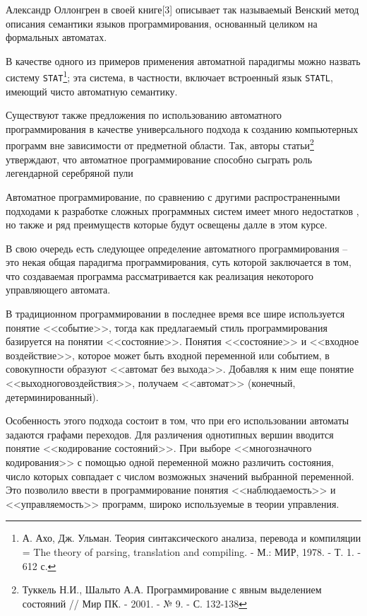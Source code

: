 \documentclass[12pt, twoside]{report}
\begin{document}
Александр Оллонгрен в своей книге[3] описывает так называемый Венский метод описания семантики языков программирования, основанный целиком на формальных автоматах.

В качестве одного из примеров применения автоматной парадигмы можно назвать систему \texttt{STAT}\footnote{А. Ахо, Дж. Ульман. Теория синтаксического анализа, перевода и компиляции = The theory of parsing, translation and compiling. - М.: МИР, 1978. - Т. 1. - 612 с.}; эта система, в частности, включает встроенный язык \texttt{STATL}, имеющий чисто автоматную семантику.

Существуют также предложения по использованию автоматного программирования в качестве универсального подхода к созданию компьютерных программ вне зависимости от предметной области. Так, авторы статьи\footnote{Туккель Н.И., Шалыто А.А. Программирование с явным выделением состояний // Мир ПК. - 2001. - № 9. - С. 132-138} утверждают, что автоматное программирование способно сыграть роль легендарной серебряной пули

Автоматное программирование, по сравнению с другими распространенными подходами к
разработке сложных программных систем имеет много недостатков ,
но также и ряд преимуществ которые будут освещены далле в этом курсе.

В свою очередь есть следующее определение автоматного программирования \cite{Karpov:AutomataLanguage} -- это некая общая парадигма программирования, суть которой заключается в том, что создаваемая программа рассматривается как реализация некоторого управляющего автомата.

В традиционном программировании в последнее время все шире используется понятие <<событие>>,
тогда как предлагаемый стиль программирования базируется на понятии <<состояние>>. Понятия
<<состояние>> и <<входное воздействие>>, которое может быть входной переменной или событием,
в совокупности образуют <<автомат без выхода>>. Добавляя к ним еще понятие <<выходноговоздействия>>,
получаем <<автомат>> (конечный, детерминированный)\cite{Shalito:AutomataProgramming2}.

Особенность этого подхода состоит в том, что при его использовании автоматы задаются графами переходов.
Для различения однотипных вершин вводится понятие <<кодирование состояний>>. При выборе <<многозначного кодирования>>
с помощью одной переменной можно различить состояния, число которых совпадает с числом возможных значений
выбранной переменной. Это позволило ввести в программирование понятия <<наблюдаемость>> и <<управляемость>>
программ, широко используемые в теории управления.
\end{document}
